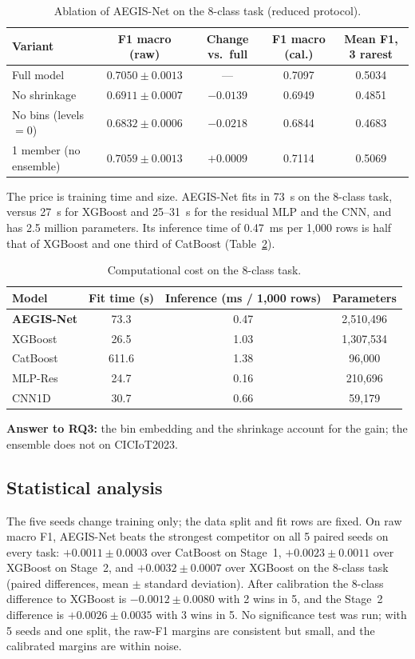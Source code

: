 \documentclass[11pt,a4paper]{article}
\newcommand{\aegis}{AEGIS-Net}
\begin{document}
\begin{table}[h]
\centering\small
\caption{Ablation of \aegis{} on the 8-class task (reduced protocol).}\label{tab:ablation}
\begin{tabular}{@{}lcccc@{}}
\toprule
Variant & F1 macro (raw) & Change vs.\ full & F1 macro (cal.) & Mean F1, 3 rarest \\
\midrule
Full model             & $0.7050\pm0.0013$ & --- & 0.7097 & 0.5034 \\
No shrinkage           & $0.6911\pm0.0007$ & $-0.0139$ & 0.6949 & 0.4851 \\
No bins (levels $=0$)  & $0.6832\pm0.0006$ & $-0.0218$ & 0.6844 & 0.4683 \\
1 member (no ensemble) & $0.7059\pm0.0013$ & $+0.0009$ & 0.7114 & 0.5069 \\
\bottomrule
\end{tabular}
\end{table}

The price is training time and size. \aegis{} fits in 73~s on the 8-class task, versus 27~s for XGBoost and 25--31~s for the residual MLP and the CNN, and has 2.5 million parameters. Its inference time of 0.47~ms per 1{,}000 rows is half that of XGBoost and one third of CatBoost (Table~\ref{tab:cost}).

\begin{table}[h]
\centering\small
\caption{Computational cost on the 8-class task.}\label{tab:cost}
\begin{tabular}{@{}lccc@{}}
\toprule
Model & Fit time (s) & Inference (ms / 1{,}000 rows) & Parameters \\
\midrule
\textbf{\aegis} & 73.3 & 0.47 & 2{,}510{,}496 \\
XGBoost  & 26.5 & 1.03 & 1{,}307{,}534 \\
CatBoost & 611.6 & 1.38 & 96{,}000 \\
MLP-Res  & 24.7 & 0.16 & 210{,}696 \\
CNN1D    & 30.7 & 0.66 & 59{,}179 \\
\bottomrule
\end{tabular}
\end{table}

\textbf{Answer to RQ3:} the bin embedding and the shrinkage account for the gain; the ensemble does not on CICIoT2023.

\subsection{Statistical analysis}
The five seeds change training only; the data split and fit rows are fixed. On raw macro F1, \aegis{} beats the strongest competitor on all 5 paired seeds on every task: $+0.0011\pm0.0003$ over CatBoost on Stage~1, $+0.0023\pm0.0011$ over XGBoost on Stage~2, and $+0.0032\pm0.0007$ over XGBoost on the 8-class task (paired differences, mean $\pm$ standard deviation). After calibration the 8-class difference to XGBoost is $-0.0012\pm0.0080$ with 2 wins in 5, and the Stage~2 difference is $+0.0026\pm0.0035$ with 3 wins in 5. No significance test was run; with 5 seeds and one split, the raw-F1 margins are consistent but small, and the calibrated margins are within noise.
\end{document}
